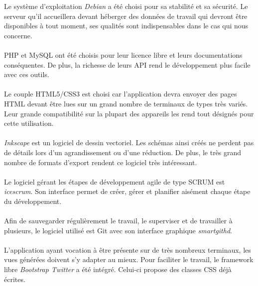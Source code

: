 \documentclass[a4paper,12pt,titlepage]{report}
\begin{document}
\newpage

Le système d'exploitation \emph{Debian} a été choisi pour sa stabilité et sa sécurité. Le serveur qu'il accueillera devant héberger des données de travail qui devront être disponibles à tout moment, ses qualités sont indispensables dans le cas qui nous concerne.
\paragraph*{}
PHP et MySQL ont été choisis pour leur licence libre et leurs documentations conséquentes. De plus, la richesse de leurs API rend le développement plus facile avec ces outils.
\paragraph*{}
Le couple HTML5/CSS3 est choisi car l'application devra envoyer des pages HTML devant être lues sur un grand nombre de terminaux de types très variés. Leur grande compatibilité sur la plupart des appareils les rend tout désignés pour cette utilisation.
\paragraph*{}
\emph{Inkscape} est un logiciel de dessin vectoriel. Les schémas ainsi créés ne perdent pas de détails lors d'un agrandissement ou d'une réduction. De plus, le très grand nombre de formats d'export rendent ce logiciel très intéressant.
\paragraph*{}
Le logiciel gérant les étapes de développement agile de type SCRUM est \emph{icescrum}. Son interface permet de créer, gérer et planifier aisément chaque étape du développement.
\paragraph*{}
Afin de sauvegarder régulièrement le travail, le superviser et de travailler à plusieurs, le logiciel utilisé est Git avec son interface graphique \emph{smartgithd}.
\paragraph*{}
L'application ayant vocation à être présente sur de très nombreux terminaux, les vues générées doivent s'y adapter au mieux. Pour faciliter le travail, le framework libre \emph{Bootstrap Twitter} a été intégré. Celui-ci propose des classes CSS déjà écrites.
\end{document}
